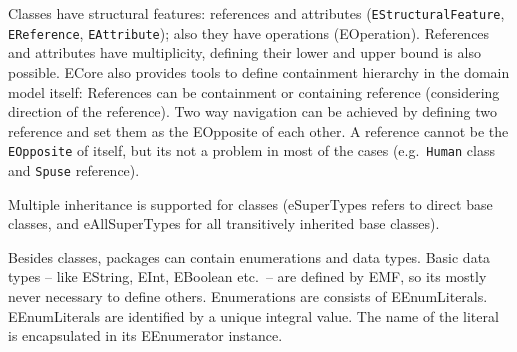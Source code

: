 Classes have structural features: references and attributes (\texttt{EStructuralFeature}, \texttt{EReference}, \texttt{EAttribute}); also they have operations (EOperation).
References and attributes have multiplicity, defining their lower and upper bound is also possible.
ECore also provides tools to define containment hierarchy in the domain model itself: References can be containment or containing reference (considering direction of the reference). 
Two way navigation can be achieved by defining two reference and set them as the EOpposite of each other. A reference cannot be the \texttt{EOpposite} of itself, but its not a problem in most of the cases (e.g.\ \texttt{Human} class and \texttt{Spuse} reference). 

Multiple inheritance is supported for classes (eSuperTypes refers to direct base classes, and eAllSuperTypes for all transitively inherited base classes).

Besides classes, packages can contain enumerations and data types. 
Basic data types -- like EString, EInt, EBoolean etc.\ -- are defined by EMF, so its mostly never necessary to define others.
Enumerations are consists of EEnumLiterals. 
EEnumLiterals are identified by a unique integral value.
The name of the literal is encapsulated in its EEnumerator instance.


